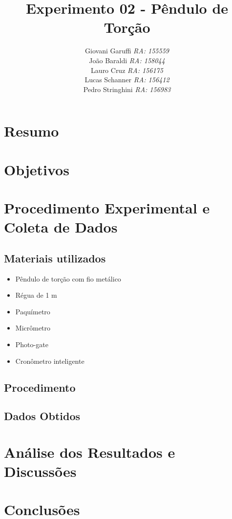\documentclass[12pt,a4paper]{article}
\begin{document}
\title{\vspace{70mm}\Huge Experimento 02 - Pêndulo de Torção}
\author{ Giovani Garuffi\qquad\hfill
		\textit {RA: 155559}\protect\\
		João Baraldi\hfill
		\textit{RA: 158044}\protect\\
		Lauro Cruz\hfill
		\textit{RA: 156175}\protect\\
		Lucas Schanner\hfill
		\textit{RA: 156412}\protect\\
		Pedro Stringhini\hfill
		\textit {RA: 156983}								
		}
\maketitle
\newpage
\section{Resumo}


\section{Objetivos}


\section{Procedimento Experimental e Coleta de Dados}
\subsection{Materiais utilizados}
\begin{itemize}
	\item Pêndulo de torção com fio metálico
	\item Régua de 1 m
	\item Paquímetro
	\item Micrômetro
	\item Photo-gate
	\item Cronômetro inteligente
\end{itemize}
\subsection{Procedimento}



\subsection{Dados Obtidos}




\section{Análise dos Resultados e Discussões}


\section{Conclusões}
\end{document}
